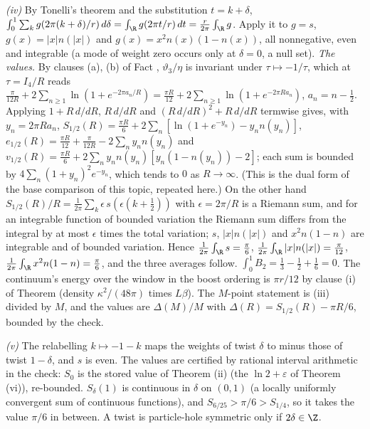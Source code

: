 \emph{(iv)} By Tonelli's theorem and the substitution $t = k + \delta$, $\int_{0}^{1}\sum_{k}g(2\pi(k + \delta)/r)\,d\delta = \int_{\R}g(2\pi t/r)\,dt = \tfrac{r}{2\pi}\int_{\R}g$. Apply it to $g = s$, $g(x) = |x|n(|x|)$ and $g(x) = x^{2}n(x)(1 - n(x))$, all nonnegative, even and integrable (a mode of weight zero occurs only at $\delta = 0$, a null set). \emph{The values.} By clauses (a), (b) of Fact , $\vartheta_{3}/\eta$ is invariant under $\tau \mapsto -1/\tau$, which at $\tau = I_4/R$ reads $\tfrac{\pi}{12R} + 2\sum_{n \ge 1}\ln(1 + e^{-2\pi a_{n}/R}) = \tfrac{\pi R}{12} + 2\sum_{n \ge 1}\ln(1 + e^{-2\pi Ra_{n}})$, $a_{n} = n - \tfrac12$. Applying $1 + R\,d/dR$, $R\,d/dR$ and $(R\,d/dR)^{2} + R\,d/dR$ termwise gives, with $y_{n} = 2\pi Ra_{n}$, $S_{1/2}(R) = \tfrac{\pi R}{6} + 2\sum_{n}[\ln(1 + e^{-y_{n}}) - y_{n}n(y_{n})]$, $e_{1/2}(R) = \tfrac{\pi R}{12} + \tfrac{\pi}{12R} - 2\sum_{n}y_{n}n(y_{n})$ and $v_{1/2}(R) = \tfrac{\pi R}{6} + 2\sum_{n}y_{n}n(y_{n})[y_{n}(1 - n(y_{n})) - 2]$; each sum is bounded by $4\sum_{n}(1 + y_{n})^{2}e^{-y_{n}}$, which tends to $0$ as $R \to \infty$. (This is the dual form of the base comparison of this topic, repeated here.) On the other hand $S_{1/2}(R)/R = \tfrac{1}{2\pi}\sum_{k}\epsilon\,s(\epsilon(k + \tfrac12))$ with $\epsilon = 2\pi/R$ is a Riemann sum, and for an integrable function of bounded variation the Riemann sum differs from the integral by at most $\epsilon$ times the total variation; $s$, $|x|n(|x|)$ and $x^{2}n(1 - n)$ are integrable and of bounded variation. Hence $\tfrac{1}{2\pi}\int_{\R}s = \tfrac{\pi}{6}$, $\tfrac{1}{2\pi}\int_{\R}|x|n(|x|) = \tfrac{\pi}{12}$, $\tfrac{1}{2\pi}\int_{\R}x^{2}n(1 - n) = \tfrac{\pi}{6}$, and the three averages follow. $\int_{0}^{1}B_{2} = \tfrac13 - \tfrac12 + \tfrac16 = 0$. The continuum's energy over the window in the boost ordering is $\pi r/12$ by clause (i) of Theorem  (density $\kappa^{2}/(48\pi)$ times $L\beta$). The $M$-point statement is (iii) divided by $M$, and the values are $\Delta(M)/M$ with $\Delta(R) = S_{1/2}(R) - \pi R/6$, bounded by the check.

\emph{(v)} The relabelling $k \mapsto -1 - k$ maps the weights of twist $\delta$ to minus those of twist $1 - \delta$, and $s$ is even. The values are certified by rational interval arithmetic in the check: $S_{0}$ is the stored value of Theorem (ii) (the $\ln 2 + \varepsilon$ of Theorem (vi)), re-bounded. $S_{\delta}(1)$ is continuous in $\delta$ on $(0, 1)$ (a locally uniformly convergent sum of continuous functions), and $S_{6/25} > \pi/6 > S_{1/4}$, so it takes the value $\pi/6$ in between. A twist is particle-hole symmetric only if $2\delta \in \Z$.

